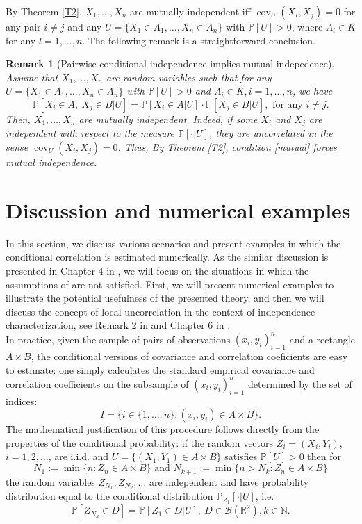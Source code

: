 \documentclass[sn-mathphys,Numbered,11pt]{sn-jnl}%
\theoremstyle{thmstyleone}%
\newtheorem{conclusion}[theorem]{Conclusion}
\newtheorem{remark}{Remark}%
\newcommand{\N}{\mathbb{N}}
\newcommand{\R}{\mathbb{R}}
\newcommand{\PP}{\mathbb{P}}
\newcommand{\KK}{\mathcal{K}}
\newcommand{\cov}{\operatorname{cov}}
\begin{document}
By Theorem \ref{T2},  $X_1,\dots,X_n$ are mutually independent iff $\cov_U(X_i,X_j)=0$ for any pair $i\neq j$ and any $U=\{X_1\in A_1,\dots,X_n\in A_n\}$ with $\PP[U]>0$, where $A_l\in K$ for any $l=1,\dots, n$. The following remark is a straightforward conclusion.\\

\begin{remark} [Pairwise conditional independence implies mutual indepedence] Assume that $X_1,\dots,X_n$ are random variables such that for any $U=\{X_1\in A_1,\dots,X_n\in A_n\}$ with $\PP[U]>0$ and $A_i\in K, i=1,\dots,n$, we have
\begin{equation}\label{mutual}\PP[X_i \in A,\ X_j \in B|U]=\PP[X_i\in A|U]\cdot\PP[X_j\in B|U], \mbox{ for any }i\neq j.
\end{equation}
Then, $X_1,\dots,X_n$ are mutually independent. Indeed, if some $X_i$ and $X_j$ are independent with respect to the measure $\PP[\cdot|U]$, they are uncorrelated in the sense $\cov_U(X_i,X_j)=0$. Thus, By  Theorem \ref{T2}, condition \eqref{mutual} forces mutual independence.%
\end{remark}


\section{Discussion and numerical examples}\label{Discussion}
In this section, we discuss various scenarios and present examples in which the conditional correlation is estimated numerically. As the similar discussion  is presented in Chapter 4  in \cite{JJP}, we will focus on the situations in which the assumptions of \cite{JJP} are not satisfied. First, we will present numerical examples to illustrate the potential usefulness of the presented theory, and then we will discuss the concept  of local uncorrelation in the context of independence characterization, see Remark 2  in \cite{JJP} and Chapter 6 in \cite{DK}.\\

In practice,  given the sample of pairs of observations $(x_i,y_i)_{i=1}^n$ and a rectangle $A\times B$, the conditional versions of covariance and correlation coeficients are easy to estimate: one simply calculates the standard empirical covariance and correlation coefficients on the subsample of $(x_i,y_i)_{i=1}^n$ determined by the set of indices: 
$$I=\{i\in \{1,\dots,n\}\colon (x_i,y_i) \in A\times B \}.$$
The mathematical justification of this procedure follows directly from the properties of the conditional probability: if the random vectors $Z_i=(X_i,Y_i)$, $i=1,2,\dots$, are i.i.d. and $U=\{(X_1,Y_1)\in A\times B\}$ satisfies $\PP[U]>0$ then for 
$$N_1:=\min\{n\colon Z_n\in A\times B\}\mbox{ and } N_{k+1}:=\min\{n> N_k\colon Z_n\in A\times B\}$$ the random variables $Z_{N_1}, Z_{N_2},\dots$ are independent and have probability distribution equal to the conditional distribution $\PP_{Z_1}[\cdot |U]$, i.e.
$$\PP[Z_{N_k}\in D]=\PP[Z_1\in D|U],\ D\in\mathcal{B}(\R^2), k\in\N.$$
\end{document}
